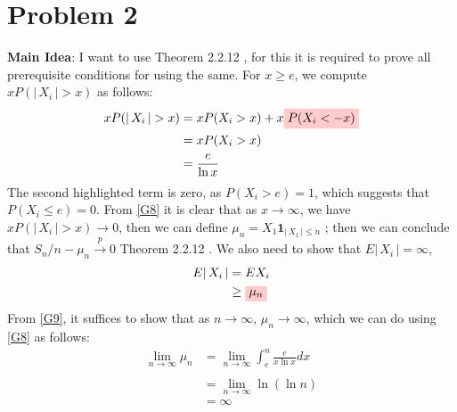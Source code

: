 \documentclass{article}
\newcommand{\highlight}[1]{%
  \colorbox{red!20}{$\displaystyle#1$}}
\newcommand{\abs}[1]{\vert \, #1 \, \vert}
\begin{document}
\section{Problem 2}
\textbf{Main Idea}: I want to use Theorem 2.2.12 \cite{10.5555/1869916}, for this it is required to prove all prerequisite conditions for using the same. For $x \geq e$, we compute $x P( \abs{X_i} > x)$ as follows: 
\begin{equation}
    \label{G8}
    \begin{split}
        xP( \abs{X_i} > x) &= xP(X_i > x) + x\highlight{P(X_i < -x)}\\
        &= xP(X_i > x)\\
        &= \frac{e}{\ln{x}}
    \end{split}
\end{equation}
The second highlighted term is zero, as $P(X_i > e) = 1$, which suggests that $P(X_i \leq e ) = 0$. From \ref{G8} it is clear that as $x \rightarrow \infty$, we have $xP( \abs{X_i} > x) \rightarrow 0$, then we can define $\mu_n = X_1\mathbf{1}_{\abs{X_1}\leq n}$ ; then we can conclude that $S_n/n - \mu_n \xrightarrow{p} 0$ Theorem 2.2.12 \cite{10.5555/1869916}. We also need to show that $E\abs{X_i} = \infty$, 
\begin{equation}
    \label{G9}
    \begin{split}
        E\abs{X_i} &= EX_i \\
        &\geq \highlight{\mu_n}
    \end{split}
\end{equation}
From \ref{G9}, it suffices to show that as $n \rightarrow \infty$, $\mu_n \rightarrow \infty$, which we can do using  \ref{G8} as follows: 
\begin{equation}
    \label{G10}
    \begin{split}
        \lim_{n\rightarrow \infty} \mu_n &= \lim_{n\rightarrow \infty}\int_{e}^{n} \frac{e}{x \ln{x}} dx\\\\
        &= \lim_{n\rightarrow \infty} \ln{(\ln{n})}\\
        &= \infty
    \end{split}
\end{equation}
\printbibliography
\end{document}
